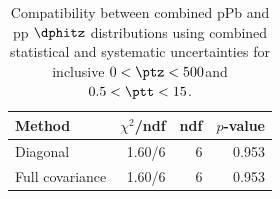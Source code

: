 \begin{table}[htp!]
\centering
\begin{tabular}{|l|r|r|r|}
\hline
Method & $\chi^2$/ndf & ndf & $p$-value \\
\hline
Diagonal & 1.60/6 & 6 & 0.953 \\
Full covariance & 1.60/6 & 6 & 0.953 \\
\hline
\end{tabular}
\caption{Compatibility between combined pPb and pp $\dphitz$ distributions using combined statistical and systematic uncertainties for inclusive $0 < \ptz < 500$\GeV and $0.5 < \ptt < 15$\GeV.}
\label{table:chisq_dphi}
\end{table}
